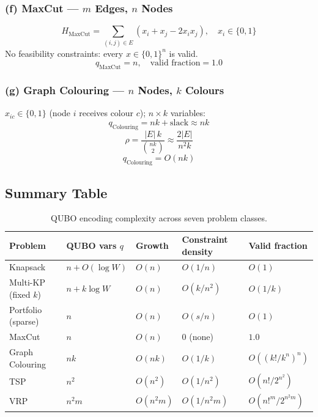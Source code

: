 \documentclass[11pt]{article}
\theoremstyle{remark}
\begin{document}
\subsubsection*{(f) MaxCut --- $m$ Edges, $n$ Nodes}

\begin{equation}
  H_{\text{MaxCut}} = \sum_{(i,j) \in E} \left(x_i + x_j - 2x_i x_j\right),
  \quad x_i \in \{0,1\}
\end{equation}
No feasibility constraints: every $x \in \{0,1\}^n$ is valid.
\begin{equation}
  \boxed{q_{\text{MaxCut}} = n, \quad \text{valid fraction} = 1.0}
\end{equation}

\subsubsection*{(g) Graph Colouring --- $n$ Nodes, $k$ Colours}

$x_{ic} \in \{0,1\}$ (node $i$ receives colour $c$); $n \times k$ variables:
\begin{equation}
  q_{\text{Colouring}} = nk + \text{slack} \approx nk
\end{equation}
\begin{equation}
  \rho = \frac{|E|\, k}{\binom{nk}{2}} \approx \frac{2|E|}{n^2 k}
\end{equation}
\begin{equation}
  \boxed{q_{\text{Colouring}} = O(nk)}
\end{equation}

\subsection{Summary Table}

\begin{table}[ht]
\centering
\caption{QUBO encoding complexity across seven problem classes.}
\label{tab:summary}
\begin{tabular}{@{}lllll@{}}
\toprule
Problem & QUBO vars $q$ & Growth & Constraint density & Valid fraction \\
\midrule
Knapsack         & $n + O(\log W)$ & $O(n)$     & $O(1/n)$      & $O(1)$ \\
Multi-KP (fixed $k$) & $n + k\log W$ & $O(n)$ & $O(k/n^2)$    & $O(1/k)$ \\
Portfolio (sparse) & $n$           & $O(n)$     & $O(s/n)$      & $O(1)$ \\
MaxCut           & $n$             & $O(n)$     & 0 (none)      & $\mathbf{1.0}$ \\
Graph Colouring  & $nk$            & $O(nk)$    & $O(1/k)$      & $O((k!/k^n)^n)$ \\
TSP              & $n^2$           & $O(n^2)$   & $O(1/n^2)$    & $O(n!/2^{n^2})$ \\
VRP              & $n^2 m$         & $O(n^2 m)$ & $O(1/n^2 m)$  & $O(n!^m/2^{n^2m})$ \\
\bottomrule
\end{tabular}
\end{table}
\end{document}
